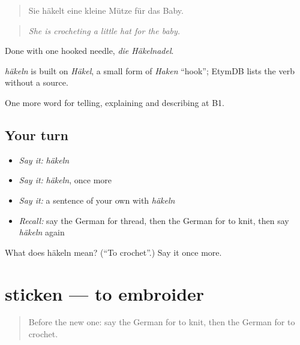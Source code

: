 \begin{quote}
Sie häkelt eine kleine Mütze für das Baby.
\end{quote}

\begin{quote}
\emph{She is crocheting a little hat for the baby.}
\end{quote}

Done with one hooked needle, \emph{die Häkelnadel}.

\begin{cousinweb}
\emph{häkeln} is built on \emph{Häkel}, a small form of \emph{Haken} \textquotedblleft{}hook\textquotedblright{}; EtymDB lists the verb without a source.
\end{cousinweb}

\begin{grammarlens}[title={What you've built}]
One more word for telling, explaining and describing at B1.
\end{grammarlens}

\subsection*{Your turn}
\begin{itemize}
\raggedright
  \item \emph{Say it:} \emph{häkeln}
  \item \emph{Say it:} \emph{häkeln}, once more
  \item \emph{Say it:} a sentence of your own with \emph{häkeln}
  \item \emph{Recall:} say the German for thread, then the German for to knit, then say \emph{häkeln} again
\end{itemize}

\begin{tcolorbox}[breakable,colback=teal!4,colframe=teal!35!black,title={Before you move on}]
What does häkeln mean? (\textquotedblleft{}To crochet\textquotedblright{}.) Say it once more.
\end{tcolorbox}
\section[sticken]{sticken — to embroider}

\label{lesson:GE-C499-sticken}



\begin{quote}
Before the new one: say the German for to knit, then the German for to crochet.
\end{quote}

